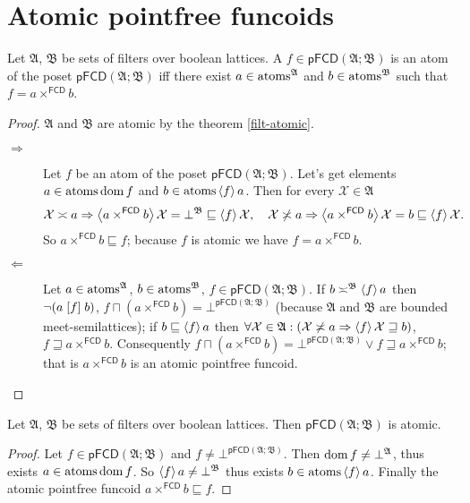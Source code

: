 \section{Atomic pointfree funcoids}
\begin{thm}
\label{pf-atom}Let $\mathfrak{A}$, $\mathfrak{B}$ be sets of filters
over boolean lattices. A $f\in\mathsf{pFCD}(\mathfrak{A};\mathfrak{B})$
is an atom of the poset $\mathsf{pFCD}(\mathfrak{A};\mathfrak{B})$
iff there exist $a\in\operatorname{atoms}^{\mathfrak{A}}$ and $b\in\operatorname{atoms}^{\mathfrak{B}}$
such that $f=a\times^{\mathsf{FCD}}b$.\end{thm}
\begin{proof}
$\mathfrak{A}$ and $\mathfrak{B}$ are atomic by the theorem \ref{filt-atomic}.
\begin{description}
\item [{$\Rightarrow$}] Let $f$ be an atom of the poset $\mathsf{pFCD}(\mathfrak{A};\mathfrak{B})$.
Let's get elements $a\in\operatorname{atoms}\operatorname{dom} f$ and $b\in\operatorname{atoms}\left\langle f\right\rangle a$.
Then for every $\mathcal{X}\in\mathfrak{A}$
\[
\mathcal{X}\asymp a\Rightarrow\left\langle a\times^{\mathsf{FCD}}b\right\rangle\mathcal{X}=\bot^{\mathfrak{B}}\sqsubseteq\left\langle f\right\rangle\mathcal{X},\quad\mathcal{X}\not\asymp a\Rightarrow\left\langle a\times^{\mathsf{FCD}}b\right\rangle\mathcal{X}=b\sqsubseteq\left\langle f\right\rangle\mathcal{X}.
\]
So $a\times^{\mathsf{FCD}}b\sqsubseteq f$; because $f$ is atomic
we have $f=a\times^{\mathsf{FCD}}b$.
\item [{$\Leftarrow$}] Let $a\in\operatorname{atoms}^{\mathfrak{A}}$, $b\in\operatorname{atoms}^{\mathfrak{B}}$,
$f\in\mathsf{pFCD}(\mathfrak{A};\mathfrak{B})$. If $b\asymp^{\mathfrak{B}}\left\langle f\right\rangle a$
then $\lnot(a\mathrel{\left[f\right]}b)$, $f\sqcap(a\times^{\mathsf{FCD}}b)=\bot^{\mathsf{pFCD}(\mathfrak{A};\mathfrak{B})}$
(because $\mathfrak{A}$ and $\mathfrak{B}$ are bounded meet-semilattices);
if $b\sqsubseteq\left\langle f\right\rangle a$ then $\forall\mathcal{X}\in\mathfrak{A}:(\mathcal{X}\not\asymp a\Rightarrow\left\langle f\right\rangle\mathcal{X}\sqsupseteq b)$,
$f\sqsupseteq a\times^{\mathsf{FCD}}b$. Consequently $f\sqcap(a\times^{\mathsf{FCD}}b)=\bot^{\mathsf{pFCD}(\mathfrak{A};\mathfrak{B})}\lor f\sqsupseteq a\times^{\mathsf{FCD}}b$;
that is $a\times^{\mathsf{FCD}}b$ is an atomic pointfree funcoid.
\end{description}
\end{proof}
\begin{thm}
Let $\mathfrak{A}$, $\mathfrak{B}$ be sets of filters over boolean
lattices. Then $\mathsf{pFCD}(\mathfrak{A};\mathfrak{B})$ is atomic.\end{thm}
\begin{proof}
Let $f\in\mathsf{pFCD}(\mathfrak{A};\mathfrak{B})$ and $f\neq\bot^{\mathsf{pFCD}(\mathfrak{A};\mathfrak{B})}$.
Then $\operatorname{dom} f\neq\bot^{\mathfrak{A}}$, thus exists $a\in\operatorname{atoms}\operatorname{dom} f$.
So $\left\langle f\right\rangle a\neq\bot^{\mathfrak{B}}$ thus exists $b\in\operatorname{atoms}\left\langle f\right\rangle a$.
Finally the atomic pointfree funcoid $a\times^{\mathsf{FCD}}b\sqsubseteq f$.\end{proof}
